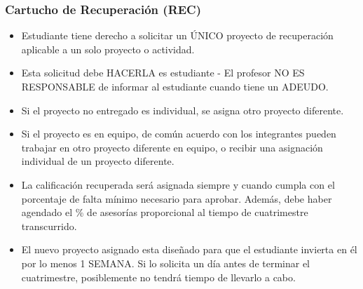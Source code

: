 
\begin{frame}
\frametitle{Cartucho de Recuperación (REC)}
\begin{itemize}
\item Estudiante tiene derecho a solicitar un ÚNICO proyecto de recuperación aplicable a un solo proyecto o actividad.
\item Esta solicitud debe HACERLA es estudiante - El profesor NO ES RESPONSABLE de informar al estudiante cuando tiene un ADEUDO.  
\item Si el proyecto no entregado es individual, se asigna otro proyecto diferente.
\item Si el proyecto es en equipo, de común acuerdo con los integrantes pueden trabajar en otro proyecto diferente en equipo, o recibir una asignación individual de un proyecto diferente.
\item La calificación recuperada será asignada siempre y cuando cumpla con el porcentaje de falta mínimo necesario para aprobar. Además, debe haber agendado el \% de asesorías proporcional al tiempo de cuatrimestre transcurrido. 
\item El nuevo proyecto asignado esta diseñado para que el estudiante invierta en él por lo menos 1 SEMANA. Si lo solicita un día antes de terminar el cuatrimestre, posiblemente no tendrá tiempo de llevarlo a cabo. 
\end{itemize}
\end{frame}
